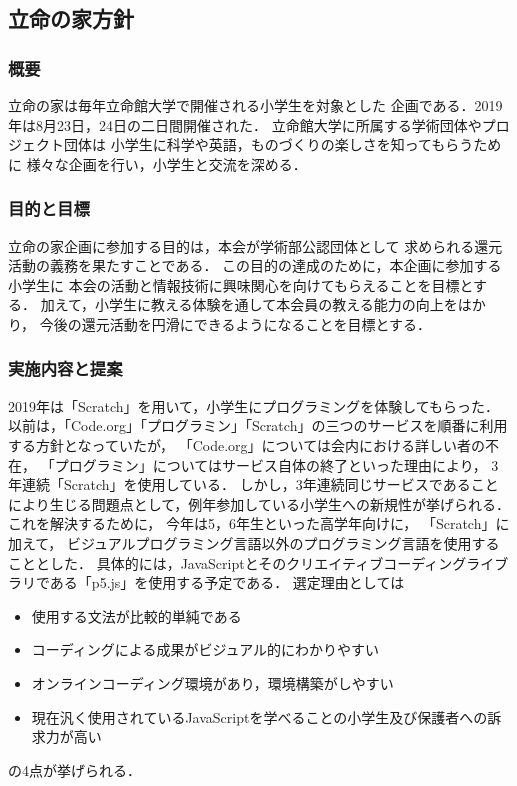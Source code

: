 \subsection*{立命の家方針}


\subsubsection*{概要}
立命の家は毎年立命館大学で開催される小学生を対象とした
企画である．2019年は8月23日，24日の二日間開催された．
立命館大学に所属する学術団体やプロジェクト団体は
小学生に科学や英語，ものづくりの楽しさを知ってもらうために
様々な企画を行い，小学生と交流を深める．

\subsubsection*{目的と目標}
立命の家企画に参加する目的は，本会が学術部公認団体として
求められる還元活動の義務を果たすことである．
この目的の達成のために，本企画に参加する小学生に
本会の活動と情報技術に興味関心を向けてもらえることを目標とする．
加えて，小学生に教える体験を通して本会員の教える能力の向上をはかり，
今後の還元活動を円滑にできるようになることを目標とする．

\subsubsection*{実施内容と提案}
2019年は「Scratch」を用いて，小学生にプログラミングを体験してもらった．
以前は，「Code.org」「プログラミン」「Scratch」の三つのサービスを順番に利用する方針となっていたが，
「Code.org」については会内における詳しい者の不在，
「プログラミン」についてはサービス自体の終了といった理由により，
3年連続「Scratch」を使用している．
しかし，3年連続同じサービスであることにより生じる問題点として，例年参加している小学生への新規性が挙げられる．
これを解決するために，
今年は5，6年生といった高学年向けに，
「Scratch」に加えて，
ビジュアルプログラミング言語以外のプログラミング言語を使用することとした．
具体的には，JavaScriptとそのクリエイティブコーディングライブラリである「p5.js」を使用する予定である．
選定理由としては
\begin {itemize}
    \item 使用する文法が比較的単純である
    \item コーディングによる成果がビジュアル的にわかりやすい
    \item オンラインコーディング環境があり，環境構築がしやすい
    \item 現在汎く使用されているJavaScriptを学べることの小学生及び保護者への訴求力が高い
\end {itemize}
の4点が挙げられる．


